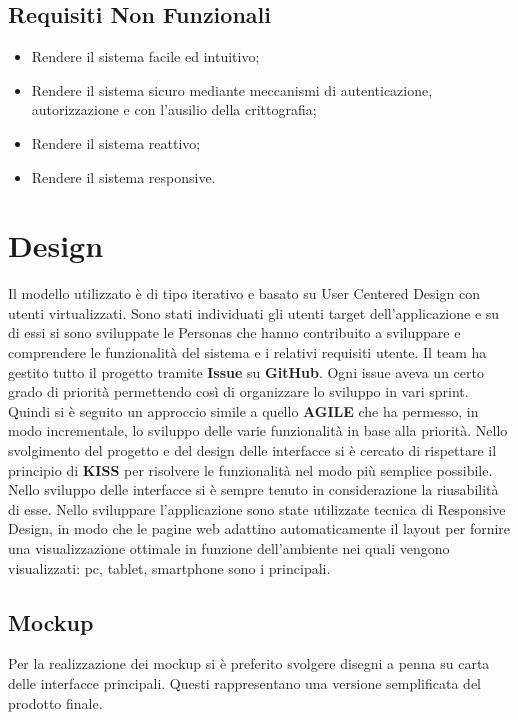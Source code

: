 \documentclass{report}
\begin{document}
\section{Requisiti Non Funzionali}
\begin{itemize}
\item Rendere il sistema facile ed intuitivo;
\item Rendere il sistema sicuro mediante meccanismi di autenticazione, autorizzazione e con l'ausilio della crittografia; 
\item Rendere il sistema reattivo;
\item  Rendere il sistema responsive.
\end{itemize}

\chapter{Design}

Il modello utilizzato è di tipo iterativo e basato su User Centered Design con utenti virtualizzati. 
Sono stati individuati gli utenti target dell’applicazione e su di essi si sono sviluppate le Personas che hanno contribuito a sviluppare e comprendere le funzionalità del sistema e i relativi requisiti utente.
Il team ha gestito tutto il progetto tramite \textbf{Issue} su \textbf{GitHub}. Ogni issue aveva un certo grado di priorità permettendo così di organizzare lo sviluppo in vari sprint.
Quindi si è seguito un approccio simile a quello \textbf{AGILE} che ha permesso, in modo incrementale, lo sviluppo delle varie funzionalità in base alla priorità.
Nello svolgimento del progetto e del design delle interfacce si è cercato di rispettare il principio di \textbf{KISS} per risolvere le funzionalità nel modo più semplice possibile. 
Nello sviluppo delle interfacce si è sempre tenuto in considerazione la riusabilità di esse.
Nello sviluppare l'applicazione sono state utilizzate tecnica di Responsive Design, in modo che le pagine web adattino automaticamente il layout per
fornire una visualizzazione ottimale in funzione dell'ambiente nei quali vengono visualizzati: pc, tablet, smartphone sono i principali.
\section{Mockup}
Per la realizzazione dei mockup si è preferito svolgere disegni a penna su carta delle interfacce principali. Questi rappresentano una versione semplificata del prodotto finale.
\end{document}
